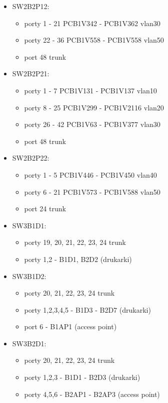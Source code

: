 \documentclass[a4paper, 12pt]{article}
\begin{document}
\begin{itemize}
\item SW2B2P12:
	\begin{itemize}
	\item porty 1 - 21 PCB1V342 - PCB1V362 vlan30
	\item porty 22 - 36 PCB1V558 - PCB1V558 vlan50
	\item port 48 trunk
	\end{itemize}
	
\item SW2B2P21:
	\begin{itemize}
	\item porty 1 - 7 PCB1V131 - PCB1V137 vlan10
	\item porty 8 - 25 PCB1V299 - PCB1V2116 vlan20
	\item porty 26 - 42 PCB1V63 - PCB1V377 vlan30
	\item port 48 trunk
	\end{itemize}
	
\item SW2B2P22:
	\begin{itemize}
	\item porty 1 - 5 PCB1V446 - PCB1V450 vlan40
	\item porty 6 - 21 PCB1V573 - PCB1V588 vlan50
	\item port 24 trunk
	\end{itemize}

\item SW3B1D1:
	\begin{itemize}
	\item porty 19, 20, 21, 22, 23, 24 trunk
	\item porty 1,2 - B1D1, B2D2 (drukarki)
	\end{itemize}
	
\item SW3B1D2:
	\begin{itemize}
	\item porty 20, 21, 22, 23, 24 trunk
	\item porty 1,2,3,4,5 - B1D3 - B2D7 (drukarki)
	\item port 6 - B1AP1 (access point)
	\end{itemize}
	
\item SW3B2D1:
	\begin{itemize}
	\item porty 20, 21, 22, 23, 24 trunk
	\item porty 1,2,3 - B1D1 - B2D3 (drukarki)
	\item porty 4,5,6 - B2AP1 - B2AP3 (access point)
	\end{itemize}
	
\end{itemize}
\end{document}
